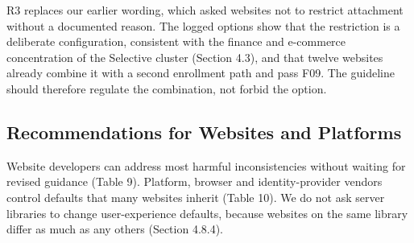 \documentclass[letterpaper,twocolumn,10pt]{article}
\begin{document}
R3 replaces our earlier wording, which asked websites not to restrict attachment without a documented reason. The logged options show that the restriction is a deliberate configuration, consistent with the finance and e-commerce concentration of the Selective cluster (Section 4.3), and that twelve websites already combine it with a second enrollment path and pass F09. The guideline should therefore regulate the combination, not forbid the option.

\subsection{Recommendations for Websites and Platforms}

Website developers can address most harmful inconsistencies without waiting for revised guidance (Table 9). Platform, browser and identity-provider vendors control defaults that many websites inherit (Table 10). We do not ask server libraries to change user-experience defaults, because websites on the same library differ as much as any others (Section 4.8.4).
\end{document}
